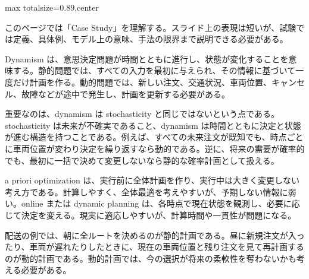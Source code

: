 \begin{minipage}[t]{0.58\textwidth}
\begin{adjustbox}{max totalsize={\textwidth}{0.89\textheight},center}
\begin{minipage}{\textwidth}\scriptsize
{}このページでは「Case Study」を理解する。スライド上の表現は短いが、試験では定義、具体例、モデル上の意味、手法の限界まで説明できる必要がある。\par
Dynamism は、意思決定問題が時間とともに進行し、状態が変化することを意味する。静的問題では、すべての入力を最初に与えられ、その情報に基づいて一度だけ計画を作る。動的問題では、新しい注文、交通状況、車両位置、キャンセル、故障などが途中で発生し、計画を更新する必要がある。\par
重要なのは、dynamism は stochasticity と同じではないという点である。stochasticity は未来が不確実であること、dynamism は時間とともに決定と状態が進む構造を持つことである。例えば、すべての未来注文が既知でも、時点ごとに車両位置が変わり決定を繰り返すなら動的である。逆に、将来の需要が確率的でも、最初に一括で決めて変更しないなら静的な確率計画として扱える。\par
a priori optimization は、実行前に全体計画を作り、実行中は大きく変更しない考え方である。計算しやすく、全体最適を考えやすいが、予期しない情報に弱い。online または dynamic planning は、各時点で現在状態を観測し、必要に応じて決定を変える。現実に適応しやすいが、計算時間や一貫性が問題になる。\par
配送の例では、朝に全ルートを決めるのが静的計画である。昼に新規注文が入ったり、車両が遅れたりしたときに、現在の車両位置と残り注文を見て再計画するのが動的計画である。動的計画では、今の選択が将来の柔軟性を奪わないかも考える必要がある。\par

\end{minipage}
\end{adjustbox}
\end{minipage}
